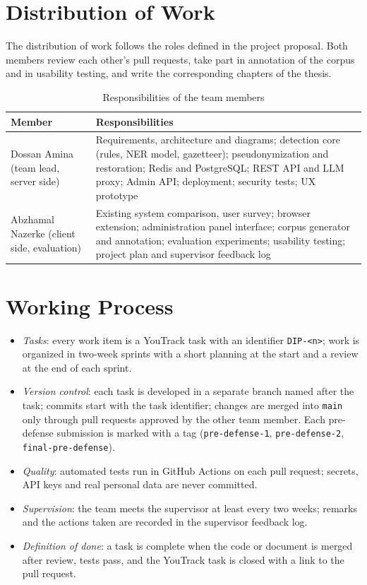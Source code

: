 \documentclass[12pt,a4paper]{article}
\newcommand{\rl}{\arrayrulecolor{linegray}\hline\arrayrulecolor{black}}
\newcommand{\thead}{\rowcolor{headgray}}
\begin{document}
\section{Distribution of Work}

The distribution of work follows the roles defined in the project proposal. Both members review each other's pull requests, take part in annotation of the corpus and in usability testing, and write the corresponding chapters of the thesis.

\begin{table}[H]
\caption{Responsibilities of the team members}\label{tab:roles}
\small
\begin{tabularx}{\linewidth}{P{3.6cm}L}
\toprule
\thead \textbf{Member} & \textbf{Responsibilities} \\ \midrule
Dossan Amina (team lead, server side) & Requirements, architecture and diagrams; detection core (rules, NER model, gazetteer); pseudonymization and restoration; Redis and PostgreSQL; REST API and LLM proxy; Admin API; deployment; security tests; UX prototype \\ \rl
Abzhamal Nazerke (client side, evaluation) & Existing system comparison, user survey; browser extension; administration panel interface; corpus generator and annotation; evaluation experiments; usability testing; project plan and supervisor feedback log \\
\bottomrule
\end{tabularx}
\end{table}

\section{Working Process}

\begin{itemize}
\item \emph{Tasks}: every work item is a YouTrack task with an identifier \texttt{DIP-<n>}; work is organized in two-week sprints with a short planning at the start and a review at the end of each sprint.
\item \emph{Version control}: each task is developed in a separate branch named after the task; commits start with the task identifier; changes are merged into \texttt{main} only through pull requests approved by the other team member. Each pre-defense submission is marked with a tag (\texttt{pre-defense-1}, \texttt{pre-defense-2}, \texttt{final-pre-defense}).
\item \emph{Quality}: automated tests run in GitHub Actions on each pull request; secrets, API keys and real personal data are never committed.
\item \emph{Supervision}: the team meets the supervisor at least every two weeks; remarks and the actions taken are recorded in the supervisor feedback log.
\item \emph{Definition of done}: a task is complete when the code or document is merged after review, tests pass, and the YouTrack task is closed with a link to the pull request.
\end{itemize}
\end{document}
